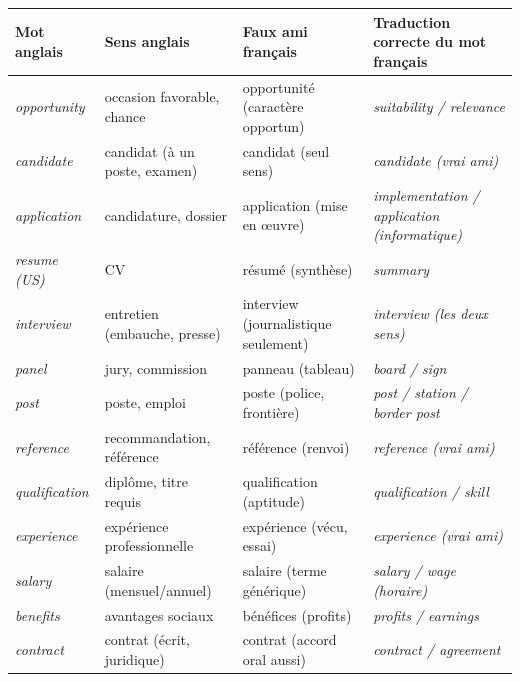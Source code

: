 \documentclass[11pt]{article}
\newcommand{\eng}[1]{\ifmmode\text{\textit{#1}}\else\begingroup\selectlanguage{english}\itshape #1\endgroup\fi}
\begin{document}
\begin{definition}
\begin{center}
\begin{tabularx}{\linewidth}{|l|l|l|X|}
\hline
\rowcolor{popblueL} \textbf{Mot anglais} & \textbf{Sens anglais} & \textbf{Faux ami français} & \textbf{Traduction correcte du mot français} \\
\hline
\eng{opportunity} & occasion favorable, chance & opportunité (caractère opportun) & \eng{suitability} / \eng{relevance} \\
\eng{candidate} & candidat (à un poste, examen) & candidat (seul sens) & \eng{candidate} (vrai ami) \\
\eng{application} & candidature, dossier & application (mise en œuvre) & \eng{implementation} / \eng{application} (informatique) \\
\eng{resume} (US) & CV & résumé (synthèse) & \eng{summary} \\
\eng{interview} & entretien (embauche, presse) & interview (journalistique seulement) & \eng{interview} (les deux sens) \\
\eng{panel} & jury, commission & panneau (tableau) & \eng{board} / \eng{sign} \\
\eng{post} & poste, emploi & poste (police, frontière) & \eng{post} / \eng{station} / \eng{border post} \\
\eng{reference} & recommandation, référence & référence (renvoi) & \eng{reference} (vrai ami) \\
\eng{qualification} & diplôme, titre requis & qualification (aptitude) & \eng{qualification} / \eng{skill} \\
\eng{experience} & expérience professionnelle & expérience (vécu, essai) & \eng{experience} (vrai ami) \\
\eng{salary} & salaire (mensuel/annuel) & salaire (terme générique) & \eng{salary} / \eng{wage} (horaire) \\
\eng{benefits} & avantages sociaux & bénéfices (profits) & \eng{profits} / \eng{earnings} \\
\eng{contract} & contrat (écrit, juridique) & contrat (accord oral aussi) & \eng{contract} / \eng{agreement} \\
\hline
\end{tabularx}
\end{center}
\end{definition}
\end{document}
